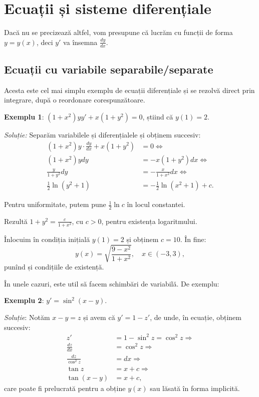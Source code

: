 \chapter{Ecuații și sisteme diferențiale}


{\color{red} Dacă nu se precizează altfel, vom presupune că lucrăm cu funcții
  de forma $y = y(x)$, deci $y'$ va însemna $\frac{dy}{dx}$.}

\section{Ecuații cu variabile separabile/separate}
\label{sec:sep}

Acesta este cel mai simplu exemplu de ecuații diferențiale și se rezolvă direct
prin integrare, după o reordonare corespunzătoare.

\textbf{Exemplu 1}: $(1 + x^2) yy' + x(1 + y^2) = 0$, știind că $y(1) = 2$.

\emph{Soluție:} Separăm variabilele și diferențialele și obținem succesiv:
\begin{align*}
  (1 + x^2) y \cdot \frac{dy}{dx} + x(1 + y^2) &= 0 \Leftrightarrow\\
  (1 + x^2) y dy &= -x(1 + y^2) dx \Leftrightarrow \\
  \frac{y}{1 + y^2} dy &= -\frac{x}{1 + x^2} dx \Leftrightarrow \\
  \frac{1}{2} \ln (y^2 + 1) &= -\frac{1}{2} \ln(x^2 + 1) + c.
\end{align*}

Pentru uniformitate, putem pune $\frac{1}{2} \ln c$ în locul constantei.

Rezultă $1 + y^2 = \frac{c}{1 + x^2}$, cu $c > 0$, pentru existența logaritmului.

Înlocuim în condiția inițială $y(1) = 2$ și obținem $c = 10$. În fine:
\[
  y(x) = \sqrt{\frac{9 - x^2}{1 + x^2}}, \quad x \in (-3, 3),
\]
punînd și condițiile de existență.

\vspace{2cm}

În unele cazuri, este util să facem schimbări de variabilă. De exemplu:

\textbf{Exemplu 2}: $y' = \sin^2(x - y)$.

\emph{Soluție}: Notăm $x - y = z$ și avem că $y' = 1 - z'$, de unde, în
ecuație, obținem succesiv:
\begin{align*}
  z' & = 1 - \sin^2 z = \cos^2 z \Rightarrow\\
  \frac{dz}{dx} &= \cos^2 z \Rightarrow \\
  \frac{dz}{\cos^2 z} &= dx \Rightarrow \\
  \tan z &= x + c \Rightarrow \\
  \tan (x - y) &= x + c,
\end{align*}
care poate fi prelucrată pentru a obține $y(x)$ sau lăsată în forma implicită.

